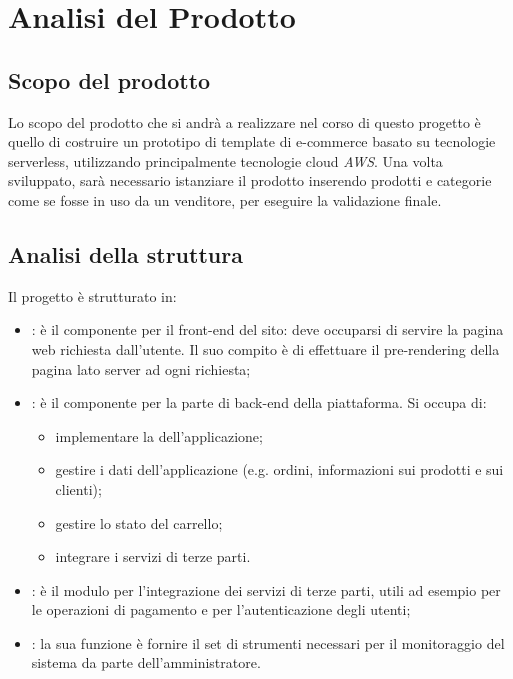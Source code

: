 \section{Analisi del Prodotto}
\subsection{Scopo del prodotto}
Lo scopo del prodotto che si andrà a realizzare nel corso di questo progetto è quello di costruire un prototipo di
template di e-commerce basato su tecnologie serverless, utilizzando principalmente tecnologie cloud \textit{AWS}.
Una volta sviluppato, sarà necessario istanziare il prodotto inserendo prodotti e categorie come se fosse in uso
da un venditore, per eseguire la validazione finale.

\subsection{Analisi della struttura}
Il progetto \textit{} è strutturato in:
\begin{itemize}
    \item \textbf{}: è il componente per il front-end del sito: deve occuparsi di servire la pagina web richiesta dall'utente. Il suo compito è di effettuare il pre-rendering della pagina lato server ad ogni richiesta;
	\item \textbf{}: è il componente per la parte di back-end della piattaforma. Si occupa di:
	\begin{itemize}
        \item implementare la \textit{} dell'applicazione;
        \item gestire i dati dell'applicazione (e.g. ordini, informazioni sui prodotti e sui clienti);
        \item gestire lo stato del carrello;
        \item integrare i servizi di terze parti.
    \end{itemize}
	\item \textbf{}: è il modulo per l'integrazione dei servizi di terze parti, utili ad esempio per le operazioni di pagamento e per l'autenticazione degli utenti;
	\item \textbf{}: la sua funzione è fornire il set di strumenti necessari per il monitoraggio del sistema da parte dell'amministratore.
\end{itemize}

